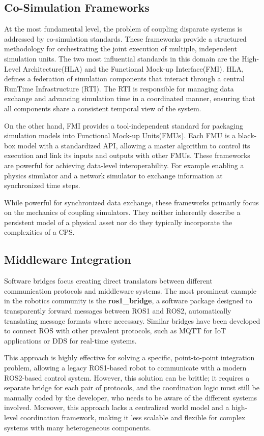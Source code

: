 \documentclass{article} %
\begin{document}
\subsection{Co-Simulation Frameworks}
At the most fundamental level, the problem of coupling disparate systems is addressed by co-simulation standards. These frameworks provide a structured methodology for orchestrating the joint execution of multiple, independent simulation units. The two most influential standards in this domain are the High-Level Architecture(HLA) and the Functional Mock-up Interface(FMI). HLA, defines a federation of simulation components that interact through a central RunTime Infrastructure (RTI). The RTI is responsible for managing data exchange and advancing simulation time in a coordinated manner, ensuring that all components share a consistent temporal view of the system\cite{dahmann1997department}. 

On the other hand, FMI provides a tool-independent standard for packaging simulation models into Functional Mock-up Units(FMUs). Each FMU is a black-box model with a standardized API, allowing a master algorithm to control its execution and link its inputs and outputs with other FMUs\cite{blochwitz2011functional}. These frameworks are powerful for achieving data-level interoperability. For example enabling a physics simulator and a network simulator to exchange information at synchronized time steps.

While powerful for synchronized data exchange, these frameworks primarily focus on the mechanics of coupling simulators. They neither inherently describe a persistent model of a physical asset nor do they typically incorporate the complexities of a CPS.

\subsection{Middleware Integration}
Software bridges focus creating direct translators between different communication protocols and middleware systems. The most prominent example in the robotics community is the \textbf{ros1\_bridge}, a software package designed to transparently forward messages between ROS1 and ROS2, automatically translating message formats where necessary\cite{macenski2020ros1bridge}. Similar bridges have been developed to connect ROS with other prevalent protocols, such as MQTT for IoT applications or DDS for real-time systems.

This approach is highly effective for solving a specific, point-to-point integration problem, allowing a legacy ROS1-based robot to communicate with a modern ROS2-based control system. However, this solution can be brittle; it requires a separate bridge for each pair of protocols, and the coordination logic must still be manually coded by the developer, who needs to be aware of the different systems involved. Moreover, this approach lacks a centralized world model and a high-level coordination framework, making it less scalable and flexible for complex systems with many heterogeneous components. 
\end{document}
